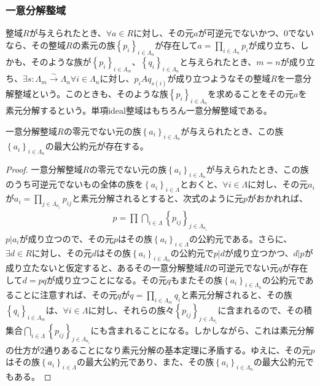 \documentclass[dvipdfmx]{jsarticle}
\begin{document}
\subsubsection{一意分解整域}%
\begin{dfn}
整域$R$が与えられたとき、$\forall a \in R$に対し、その元$a$が可逆元でないかつ、$0$でないなら、その整域$R$の素元の族$\left\{ p_{i} \right\}_{i \in \varLambda_{n}}$が存在して$a = \prod_{i \in \varLambda_{n}} p_{i}$が成り立ち、しかも、そのような族が$\left\{ p_{i} \right\}_{i \in \varLambda_{m}}$、$\left\{ q_{i} \right\}_{i \in \varLambda_{n}}$と与えられたとき、$m = n$が成り立ち、$\exists s:\varLambda_{m}\overset{\sim}{\rightarrow}\varLambda_{n}\forall i \in \varLambda_{n}$に対し、$p_{i}Aq_{s(i)}$が成り立つようなその整域$R$を一意分解整域という。このときも、そのような族$\left\{ p_{i} \right\}_{i \in \varLambda_{n}}$を求めることをその元$a$を素元分解するという。単項ideal整域はもちろん一意分解整域である。
\end{dfn}
\begin{thm}\label{3.3.5.6}
一意分解整域$R$の零元でない元の族$\left\{ a_{i} \right\}_{i \in \varLambda_{n}}$が与えられたとき、この族$\left\{ a_{i} \right\}_{i \in \varLambda_{n}}$の最大公約元が存在する。
\end{thm}
\begin{proof}
一意分解整域$R$の零元でない元の族$\left\{ a_{i} \right\}_{i \in \varLambda_{n}}$が与えられたとき、この族のうち可逆元でないもの全体の族を$\left\{ a_{i} \right\}_{i \in \varLambda}$とおくと、$\forall i \in \varLambda$に対し、その元$a_{i}$が$a_{i} = \prod_{j \in \varLambda_{n_{i}}} p_{ij}$と素元分解されるとすると、次式のように元$p$がおかれれば、
\begin{align*}
p = \prod_{} {\bigcap_{i \in \varLambda} \left\{ p_{ij} \right\}_{j \in \varLambda_{n_{i}}}}
\end{align*}
$p|a_{i}$が成り立つので、その元$p$はその族$\left\{ a_{i} \right\}_{i \in \varLambda}$の公約元である。さらに、$\exists d \in R$に対し、その元$d$はその族$\left\{ a_{i} \right\}_{i \in \varLambda_{n}}$の公約元で$p|d$が成り立つかつ、$d|p$が成り立たないと仮定すると、あるその一意分解整域$R$の可逆元でない元$q$が存在して$d = pq$が成り立つことになる。その元$q$もまたその族$\left\{ a_{i} \right\}_{i \in \varLambda_{n}}$の公約元であることに注意すれば、その元$q$が$q = \prod_{i \in \varLambda_{m}} q_{i}$と素元分解されると、その族$\left\{ q_{i} \right\}_{i \in \varLambda_{m}}$は、$\forall i \in \varLambda$に対し、それらの族々$\left\{ p_{ij} \right\}_{j \in \varLambda_{n_{i}}}$に含まれるので、その積集合$\bigcap_{i \in \varLambda} \left\{ p_{ij} \right\}_{j \in \varLambda_{n_{i}}}$にも含まれることになる。しかしながら、これは素元分解の仕方が2通りあることになり素元分解の基本定理に矛盾する。ゆえに、その元$p$はその族$\left\{ a_{i} \right\}_{i \in \varLambda}$の最大公約元であり、また、その族$\left\{ a_{i} \right\}_{i \in \varLambda_{n}}$の最大公約元でもある。
\end{proof}
\end{document}
